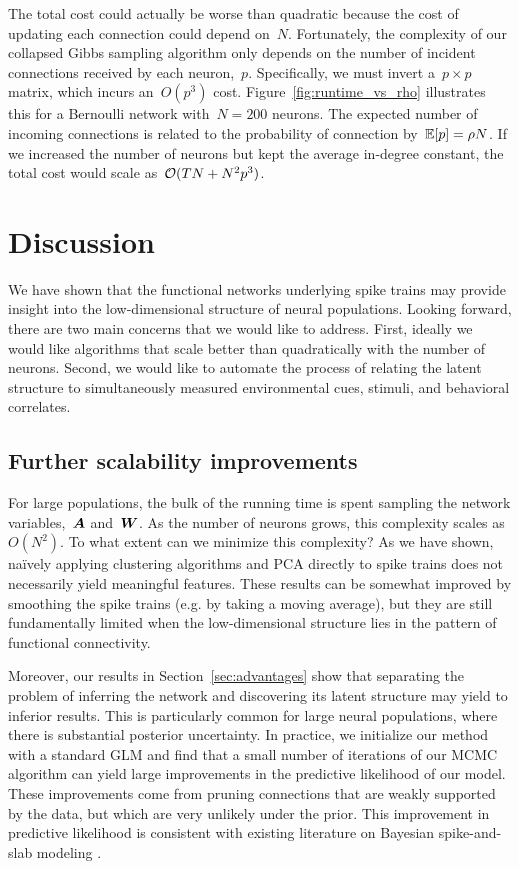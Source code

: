 The total cost could actually be worse than quadratic because the cost
of updating each connection could depend on~$N$. Fortunately, the
complexity of our collapsed Gibbs sampling algorithm only depends on
the number of incident connections received by each neuron,~$p$.
Specifically, we must invert a~$p \times p$ matrix, which incurs
an~$O(p^3)$ cost. Figure~\ref{fig:runtime_vs_rho} illustrates this for
a Bernoulli network with~$N=200$ neurons. The expected number of
incoming connections is related to the probability of connection
by~$\mathbb{E}[p]=\rho N$. If we increased the number of neurons but kept
the average in-degree constant, the total cost would scale as~${\mathcal{O}(TN + N^2 p^3)}$.



\section{Discussion}
\label{sec:discussion}
We have shown that the functional networks underlying
spike trains may provide insight into the low-dimensional
structure of neural populations. Looking forward, there are 
two main concerns that we would like to address.
First, ideally we would like algorithms that scale better 
than quadratically with the number of neurons. Second, we 
would like to automate the process of relating the latent 
structure to simultaneously measured environmental cues, stimuli, 
and behavioral correlates. 

\subsection{Further scalability improvements}
For large populations, the bulk of the running time is spent 
sampling the network variables,~$\boldsymbol{A}$ and~$\boldsymbol{W}$. As the number of
neurons grows, this complexity scales as~$O(N^2)$. To
what extent can we minimize this complexity? As we have shown,
na\"ively applying clustering algorithms and PCA directly
to spike trains does not necessarily yield meaningful features. These
results can be somewhat improved by smoothing the spike
trains (e.g. by taking a moving average), but they are still
fundamentally limited when the low-dimensional structure
lies in the pattern of functional connectivity.

Moreover, our results in Section~\ref{sec:advantages} show that 
separating the problem of inferring the network and discovering 
its latent structure may yield to inferior results. This is 
particularly common for large neural populations, where there is 
substantial posterior uncertainty. 
In practice, we initialize our method with a standard GLM and
find that a small number of iterations of our MCMC algorithm
can yield large improvements in the predictive likelihood of our
model. These improvements come from pruning connections that are
weakly supported by the data, but which are very unlikely under the
prior. This improvement in predictive likelihood is consistent with
existing literature on Bayesian spike-and-slab modeling \citep{Mohamed-2012}.

